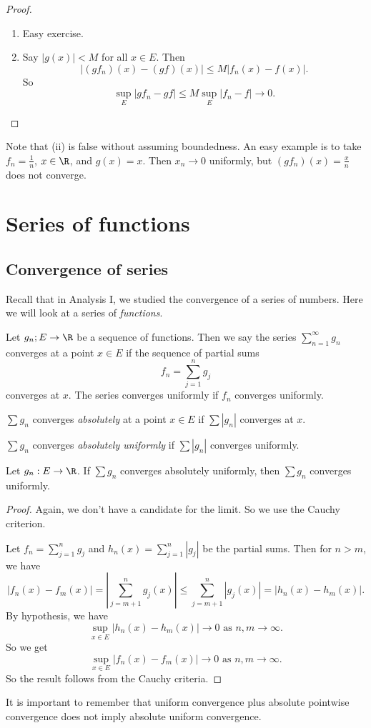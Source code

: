 \documentclass[a4paper]{article}
\begin{document}
\begin{proof}\leavevmode
  \begin{enumerate}
    \item Easy exercise.
    \item Say $|g(x)| < M$ for all $x\in E$. Then
    \[
      |(gf_n)(x) - (gf)(x)| \leq M |f_n(x) - f(x)|.
    \]
    So
    \[
      \sup_E |gf_n - gf| \leq M \sup_E |f_n - f| \to 0.
    \]
  \end{enumerate}
\end{proof}
Note that (ii) is false without assuming boundedness. An easy example is to take $f_n = \frac{1}{n}$, $x\in \R$, and $g(x) = x$. Then $x_n \to 0$ uniformly, but $(gf_n)(x) = \frac{x}{n}$ does not converge.

\section{Series of functions}
\subsection{Convergence of series}
Recall that in Analysis I, we studied the convergence of a series of numbers. Here we will look at a series of \emph{functions}.
\begin{defi}
  Let $g_n; E \to \R$ be a sequence of functions. Then we say the series $\sum_{n = 1}^\infty g_n$ converges at a point $x \in E$ if the sequence of partial sums
  \[
    f_n = \sum_{j = 1}^ng_j
  \]
  converges at $x$. The series converges uniformly if $f_n$ converges uniformly.
\end{defi}

\begin{defi}
  $\sum g_n$ converges \emph{absolutely} at a point $x\in E$ if $\sum |g_n|$ converges at $x$.

  $\sum g_n$ converges \emph{absolutely uniformly} if $\sum |g_n|$ converges uniformly.
\end{defi}

\begin{prop}
  Let $g_n: E\to \R$. If $\sum g_n$ converges absolutely uniformly, then $\sum g_n$ converges uniformly.
\end{prop}

\begin{proof}
  Again, we don't have a candidate for the limit. So we use the Cauchy criterion.

  Let $f_n = \sum\limits_{j = 1}^n g_j$ and $h_n(x) = \sum\limits_{j = 1}^n |g_j|$ be the partial sums. Then for $n > m$, we have
  \[
    |f_n(x) - f_m(x)| = \left|\sum_{j = m + 1}^n g_j(x)\right| \leq \sum_{j = m + 1}^n |g_j(x)| = |h_n(x) - h_m(x)|.
  \]
  By hypothesis, we have
  \[
    \sup_{x\in E}|h_n(x) - h_m(x)| \to 0\text{ as }n, m\to \infty.
  \]
  So we get
  \[
    \sup_{x\in E}|f_n(x) - f_m(x)| \to 0\text{ as }n, m\to \infty.
  \]
  So the result follows from the Cauchy criteria.
\end{proof}
It is important to remember that uniform convergence plus absolute pointwise convergence does not imply absolute uniform convergence.
\end{document}
